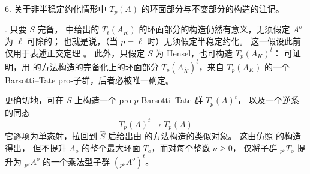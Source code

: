 %

\medskip
\noindent
\underline{6. 关于非半稳定约化情形中 $T_p(A)$ 的环面部分与不变部分的构造的注记。}

\medskip
\noindent
{}. 只要 $S$ 完备，
中给出的 $T_\ell(A_K)$ 的环面部分的构造仍然有意义，无须假定 $A^o$ 为 $\ell$ 可除的；
也就是说，（当 $p=\ell$ 时）无须假定半稳定约化。
这一假设此前仅用于表述正交定理 。
此外，只假定 $S$ 为 Hensel，也可构造 $T_p(A_K)^t$：
可证明，用  的方法构造的完备化上的环面部分
$T_p(A_{\widehat K})^t$，来自 $T_p(A_K)$ 的一个 Barsotti--Tate pro-子群，后者必被唯一确定。

更确切地，可在 $S$ \underline{上}构造一个 pro-$p$ Barsotti--Tate 群 $T_p(A)^t$，
以及一个逆系的同态
\[
 T_p(A)^t\longrightarrow T_p(A)
\]
它逐项为单态射，拉回到 $\widehat S$ 后给出由  的方法构造的类似对象。
这由仿照  的构造得出，
但不提升 $A_o$ 的整个最大环面 $T_o$，而对每个整数 $\nu\geq0$，
仅将子群 ${}_{p^\nu}T_o$ 提升为 ${}_{p^\nu}A^o$ 的一个乘法型子群 $({}_{p^\nu}A^o)^t$。

